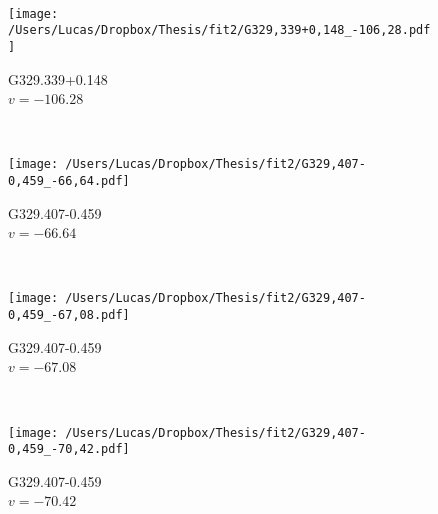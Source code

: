 \begin{figure*}[t]
\begin{subfigure}[t]{0.3\textwidth}
	\end{subfigure}
	~
	\begin{subfigure}[t]{0.3\textwidth}
		\texttt{[image: /Users/Lucas/Dropbox/Thesis/fit2/G329,339+0,148\_-106,28.pdf]}
		\caption[]{G329.339+0.148\\$v=-106.28$\,\kms}
	\end{subfigure}
	~
	\begin{subfigure}[t]{0.3\textwidth}
		\texttt{[image: /Users/Lucas/Dropbox/Thesis/fit2/G329,407-0,459\_-66,64.pdf]}
		\caption[]{G329.407-0.459\\$v=-66.64$\,\kms}
	\end{subfigure}
	~
	\begin{subfigure}[t]{0.3\textwidth}
		\texttt{[image: /Users/Lucas/Dropbox/Thesis/fit2/G329,407-0,459\_-67,08.pdf]}
		\caption[]{G329.407-0.459\\$v=-67.08$\,\kms}
	\end{subfigure}
	~
	\begin{subfigure}[t]{0.3\textwidth}
		\texttt{[image: /Users/Lucas/Dropbox/Thesis/fit2/G329,407-0,459\_-70,42.pdf]}
		\caption[]{G329.407-0.459\\$v=-70.42$\,\kms}
	\end{subfigure}
	~
\end{figure*}
\clearpage
